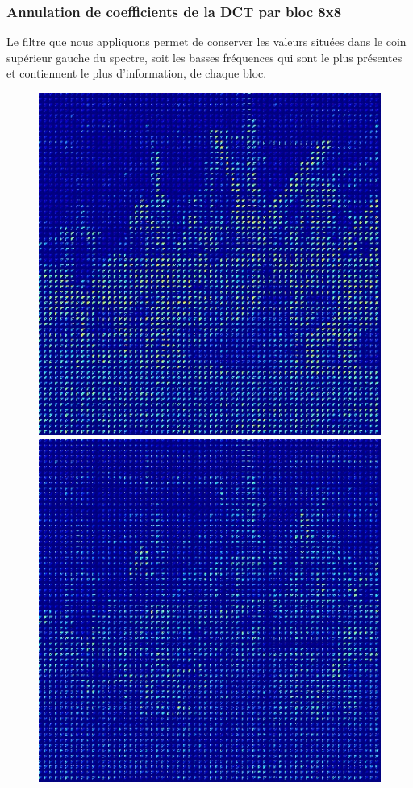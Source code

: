 \documentclass[12pt]{report}
\begin{document}
\subsubsection{Annulation de coefficients de la DCT par bloc 8x8}

Le filtre que nous appliquons permet de conserver les valeurs situées dans le coin supérieur gauche du spectre, soit les basses fréquences qui sont le plus présentes et contiennent le plus d'information, de chaque bloc.

\begin{figure}[H]
\begin{center}
\includegraphics[scale=0.25]{../ImageRes/blockdct_masked_0.jpg} 
\includegraphics[scale=0.25]{../ImageRes/blockdct_masked_1.jpg} 

\end{center}
\end{figure}
\end{document}

